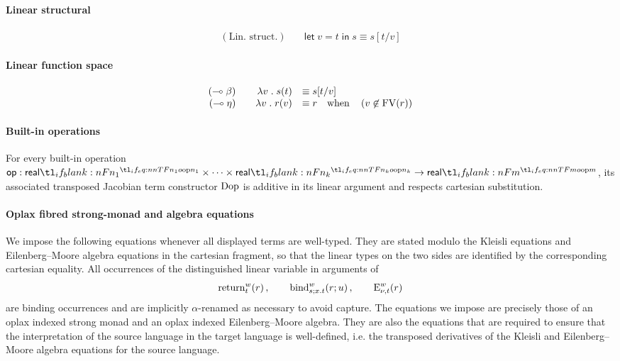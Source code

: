 \documentclass[11pt,a4paper]{article}
\theoremstyle{definition}
\theoremstyle{remark}
\providecommand{\srcop}{\mathsf{op}}
\providecommand{\casubst}[3]{#1[#3/#2]}
\providecommand{\letst}[3]{\mathsf{let}\;#1=#2\;\mathsf{in}\;#3}
\providecommand{\linto}{\multimap}
\begin{document}
\paragraph{Linear structural}

\begin{equation*}
  \begin{array}{rr}
    \left( \text{Lin. struct.} \right) 
    &\quad
      \letst{v}{t}{s}
    \equiv
      \casubst{s}{v}{t}
  \end{array}
\end{equation*}

\paragraph{Linear function space}

\begin{equation*}
  \begin{array}{rrl}
    \left( \linto \beta \right)
    &\quad
      \fn[p]{ \lambda v \; . \; s }{ t }
    &\equiv
      \casubst{s}{v}{t}
    \\
    \left( \linto \eta \right)
    &\quad
      \lambda v \; . \; \fn[n]{ r }{ v }
    &\equiv
      r
      \qq{when} \left( v \not\in \fn[n]{ \opn{FV} }{ r } \right)
  \end{array}
\end{equation*}

\paragraph{Built-in operations}
For every built-in operation \( \srcop: \srcreal[n_{1}] \times \cdots \times \srcreal[n_{k}] \to \srcreal[m] \), its associated transposed Jacobian term constructor \( \opn[b]{Dop} \) is additive in its linear argument and respects cartesian substitution.




\paragraph{Oplax fibred strong-monad and algebra equations}

We impose the following equations whenever all displayed terms are well-typed.
They are stated modulo the Kleisli equations and Eilenberg--Moore algebra equations 
in the cartesian fragment, so
that the linear types on the two sides are identified by the corresponding
cartesian equality.  All occurrences of the distinguished linear variable in
arguments of
\[
  \fn[n]{\opn[b]{return}^{w}_{t}}{r},
  \qquad
  \fn[n]{\opn[b]{bind}^{w}_{s;x.t}}{r;u},
  \qquad
  \fn[n]{\opn[b]{E}^{w}_{\nu,t}}{r}
\]
are binding occurrences and are implicitly \(\alpha\)-renamed as necessary to
avoid capture.
The equations we impose are precisely those of an oplax indexed strong monad and an oplax indexed Eilenberg--Moore algebra.
They are also the equations that are required to ensure that the interpretation of the source language in the target language is well-defined, i.e. the transposed derivatives of the Kleisli and Eilenberg--Moore algebra equations for the source language.
\end{document}

